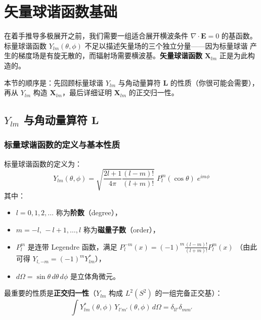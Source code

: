 \section{矢量球谐函数基础}

在着手推导多极展开之前，我们需要一组适合展开横波条件 $\nabla\cdot\mathbf{E}=0$ 的基函数。
标量球谐函数 $Y_{lm}(\theta,\phi)$ 不足以描述矢量场的三个独立分量——因为标量球谐
产生的梯度场是有旋无散的，而辐射场需要横波基。\textbf{矢量球谐函数} $\mathbf{X}_{lm}$
正是为此构造的。

本节的顺序是：先回顾标量球谐 $Y_{lm}$ 与角动量算符 $\mathbf{L}$ 的性质（你很可能会需要），
再从 $Y_{lm}$ 构造 $\mathbf{X}_{lm}$，最后详细证明 $\mathbf{X}_{lm}$ 的正交归一性。

\subsection{$Y_{lm}$ 与角动量算符 $\mathbf{L}$}

\subsubsection{标量球谐函数的定义与基本性质}

标量球谐函数的定义为：
\begin{equation}
Y_{lm}(\theta,\phi)
= \sqrt{\frac{2l+1}{4\pi}\frac{(l-m)!}{(l+m)!}}\;
  P_l^m(\cos\theta)\;e^{im\phi}
\tag{1.1}
\end{equation}
其中：
\begin{itemize}
  \item $l = 0,1,2,\ldots$ 称为\textbf{阶数}（degree），
  \item $m = -l,\,-l+1,\ldots,l$ 称为\textbf{磁量子数}（order），
  \item $P_l^m$ 是连带 Legendre 函数，满足 $P_l^{-m}(x) = (-1)^m\frac{(l-m)!}{(l+m)!}P_l^m(x)$
    （由此可得 $Y_{l,-m} = (-1)^m Y_{lm}^*$），
  \item $d\Omega = \sin\theta\,d\theta\,d\phi$ 是立体角微元。
\end{itemize}

最重要的性质是\textbf{正交归一性}（$Y_{lm}$ 构成 $L^2(S^2)$ 的一组完备正交基）：
\begin{equation}
\int Y_{lm}^*(\theta,\phi)\,Y_{l'm'}(\theta,\phi)\,d\Omega = \delta_{ll'}\delta_{mm'}
\tag{1.2}
\end{equation}

